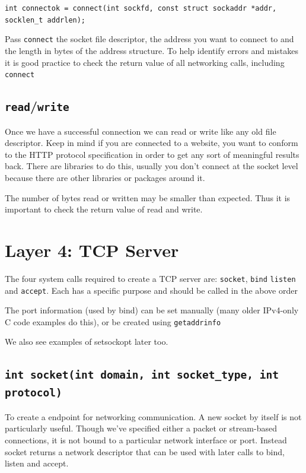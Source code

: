 \texttt{int connectok = connect(int sockfd, const struct sockaddr *addr, socklen\_t addrlen);}

Pass \texttt{connect} the socket file descriptor, the address you want to connect to and the length in bytes of the address structure. To help identify errors and mistakes it is good practice to check the return value of all networking calls, including \texttt{connect}

\subsection{\texorpdfstring{\texttt{read}/\texttt{write}}{read/write}}\label{readwrite}

Once we have a successful connection we can read or write like any old file descriptor. Keep in mind if you are connected to a website, you want to conform to the HTTP protocol specification in order to get any sort of meaningful results back. There are libraries to do this, usually you don't connect at the socket level because there are other libraries or packages around it.

The number of bytes read or written may be smaller than expected. Thus it is important to check the return value of read and write.

\section{Layer 4: TCP Server}

The four system calls required to create a TCP server are: \texttt{socket}, \texttt{bind} \texttt{listen} and \texttt{accept}. Each has a specific purpose and should be called in the above order

The port information (used by bind) can be set manually (many older IPv4-only C code examples do this), or be created using \texttt{getaddrinfo}

We also see examples of setsockopt later too.

\subsection{\texttt{int socket(int domain, int socket\_type, int protocol)}}

To create a endpoint for networking communication. A new socket by itself is not particularly useful. Though we've specified either a packet or stream-based connections, it is not bound to a particular network interface or port. Instead socket returns a network descriptor that can be used with later calls to bind, listen and accept.

